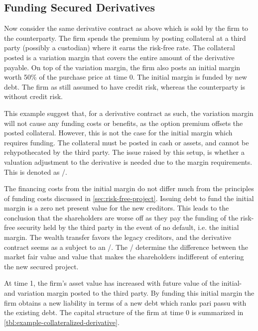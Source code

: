 \documentclass[../main.tex]{subfiles}
\begin{document}
    \subsection{Funding Secured Derivatives}
        Now consider the same derivative contract as above which is sold by the firm to the counterparty.
        The firm spends the premium by posting collateral at a third party (possibly a custodian) where it earns the risk-free rate.
        The collateral posted is a variation margin that covers the entire amount of the derivative payable.
        On top of the variation margin, the firm also posts an initial margin worth 50\% of the purchase price at time 0.
        The initial margin is funded by new debt.
        The firm as still assumed to have credit risk, whereas the counterparty is without credit risk.


        This example suggest that, for a derivative contract as such,
        the variation margin will not cause any funding costs or benefits,
        as the option premium offsets the posted collateral.
        However, this is not the case for the initial margin which requires funding.
        The collateral must be posted in cash or assets, and cannot be rehypothecated by the third party.
        The issue raised by this setup, is whether a valuation adjustment to the derivative is needed due to the margin requirements.
        This is denoted as \MVA/.

        The financing costs from the initial margin do not differ much from the principles of funding costs discussed in \cref{sec:risk-free-project}.
        Issuing debt to fund the initial margin is a zero net present value for the new creditors.
        This leads to the conclusion that the shareholders are worse off as they pay the funding of the risk-free security held by the third party in the event of no default, i.e. the initial margin.
        The wealth transfer favors the legacy creditors,
        and the derivative contract seems as a subject to an \MVA/.
        The \MVA/ determine the difference between the market fair value and value that makes the shareholders indifferent of entering the new secured project.

        At time 1, the firm's asset value has increased with future value of the initial- and variation margin posted to the third party.
        By funding this initial margin the firm obtains a new liability in terms of a new debt which ranks pari passu with the existing debt.
        The capital structure of the firm at time 0 is summarized in \cref{tbl:example-collateralized-derivative}.
\end{document}
